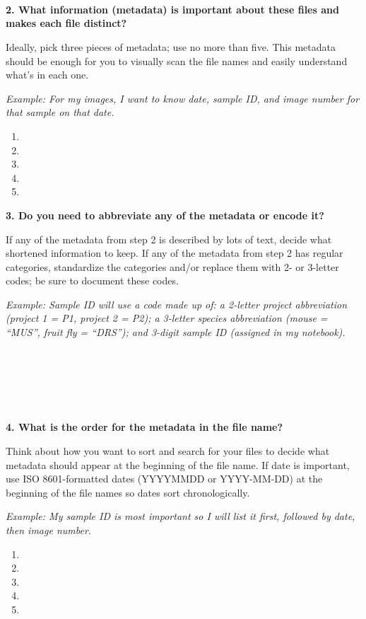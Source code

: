 \documentclass[
]{book}
\providecommand{\tightlist}{%
  \setlength{\itemsep}{0pt}\setlength{\parskip}{0pt}}
\begin{document}
~

~

~

\textbf{2. What information (metadata) is important about these files and makes each file distinct?}

Ideally, pick three pieces of metadata; use no more than five. This metadata should be enough for you to visually scan the file names and easily understand what's in each one.

\emph{Example: For my images, I want to know date, sample ID, and image number for that sample on that date.}

\begin{enumerate}
\def\labelenumi{\arabic{enumi}.}
\tightlist
\item
\item
\item
\item
\item
\end{enumerate}

\textbf{3. Do you need to abbreviate any of the metadata or encode it?}

If any of the metadata from step 2 is described by lots of text, decide what shortened information to keep. If any of the metadata from step 2 has regular categories, standardize the categories and/or replace them with 2- or 3-letter codes; be sure to document these codes.

\emph{Example: Sample ID will use a code made up of: a 2-letter project abbreviation (project 1 = P1, project 2 = P2); a 3-letter species abbreviation (mouse = ``MUS'', fruit fly = ``DRS''); and 3-digit sample ID (assigned in my notebook).}

~

~

~

\textbf{4. What is the order for the metadata in the file name?}

Think about how you want to sort and search for your files to decide what metadata should appear at the beginning of the file name. If date is important, use ISO 8601-formatted dates (YYYYMMDD or YYYY-MM-DD) at the beginning of the file names so dates sort chronologically.

\emph{Example: My sample ID is most important so I will list it first, followed by date, then image number.}

\begin{enumerate}
\def\labelenumi{\arabic{enumi}.}
\tightlist
\item
\item
\item
\item
\item
\end{enumerate}
\end{document}
